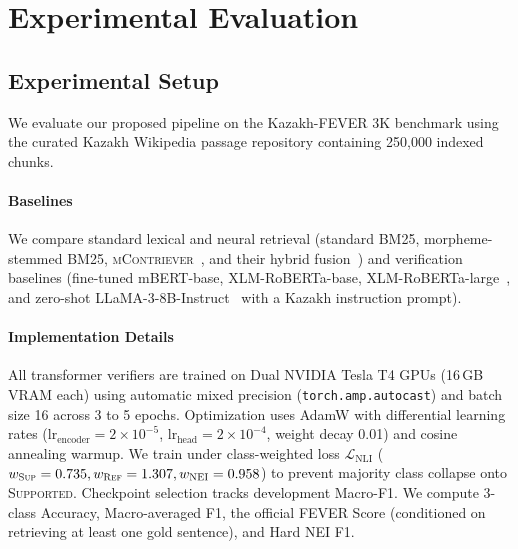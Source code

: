 \section{Experimental Evaluation}
\label{sec:experiments}

\subsection{Experimental Setup}
We evaluate our proposed pipeline on the Kazakh-FEVER 3K benchmark using the curated Kazakh Wikipedia passage repository containing 250,000 indexed chunks.

\paragraph{Baselines}
We compare standard lexical and neural retrieval (standard BM25, morpheme-stemmed BM25, \textsc{mContriever}~\citep{izacard2022mcontriever}, and their hybrid fusion~\citep{mudunuri-etal-2026-bounded}) and verification baselines (fine-tuned mBERT-base, XLM-RoBERTa-base, XLM-RoBERTa-large~\citep{conneau2020xlmr}, and zero-shot LLaMA-3-8B-Instruct~\citep{dubey2024llama3} with a Kazakh instruction prompt).

\paragraph{Implementation Details}
All transformer verifiers are trained on Dual NVIDIA Tesla T4 GPUs (16\,GB VRAM each) using automatic mixed precision (\texttt{torch.amp.autocast}) and batch size 16 across 3 to 5 epochs. Optimization uses AdamW with differential learning rates ($\text{lr}_{\text{encoder}} = 2 \times 10^{-5}$, $\text{lr}_{\text{head}} = 2 \times 10^{-4}$, weight decay 0.01) and cosine annealing warmup. We train under class-weighted loss $\mathcal{L}_{\text{NLI}}$ ($w_{\textsc{Sup}}=0.735, w_{\textsc{Ref}}=1.307, w_{\textsc{NEI}}=0.958$) to prevent majority class collapse onto \textsc{Supported}. Checkpoint selection tracks development Macro-F1. We compute 3-class Accuracy, Macro-averaged F1, the official FEVER Score (conditioned on retrieving at least one gold sentence), and Hard NEI F1.

\begin{table}[t]
\centering
\small
\caption{Retrieval effectiveness on the multi-domain Kazakh knowledge corpus. Best results in bold.}
\label{tab:retrieval_results}
\end{table}

